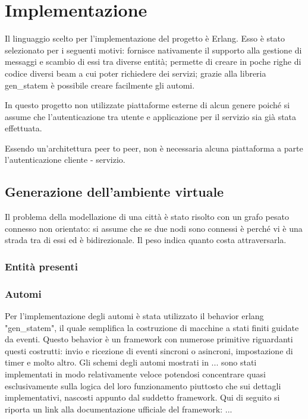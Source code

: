 
\chapter{Implementazione}

Il linguaggio scelto per l'implementazione del progetto è Erlang. Esso è stato selezionato per i seguenti motivi: fornisce nativamente il supporto alla gestione di messaggi e scambio di essi tra diverse entità; permette di creare in poche righe di codice diversi beam a cui poter richiedere dei servizi; grazie alla libreria gen\_statem è possibile creare facilmente gli automi.

In questo progetto non utilizzate piattaforme esterne di alcun genere poiché si assume che l'autenticazione tra utente e applicazione per il servizio sia già stata effettuata.

Essendo un'architettura peer to peer, non è necessaria alcuna piattaforma a parte l'autenticazione cliente - servizio.

\section{Generazione dell'ambiente virtuale}
Il problema della modellazione di una città è stato risolto con un grafo pesato connesso non orientato: si assume che se due nodi sono connessi è perché vi è una strada tra di essi ed è bidirezionale. Il peso indica quanto costa attraversarla. 

\subsection{Entità presenti}
\subsection{Automi}
Per l'implementazione degli automi è stata utilizzato il behavior erlang "gen\_statem", il quale semplifica la costruzione di macchine a stati finiti guidate da eventi. Questo behavior è un framework con numerose primitive riguardanti questi costrutti: invio e ricezione di eventi sincroni o asincroni, impostazione di timer e molto altro. Gli schemi degli automi mostrati in ... sono stati implementati in modo relativamente veloce potendosi concentrare quasi esclusivamente sulla logica del loro funzionamento piuttosto che sui dettagli implementativi, nascosti appunto dal suddetto framework. 
Qui di seguito si riporta un link alla documentazione ufficiale del framework: ...
